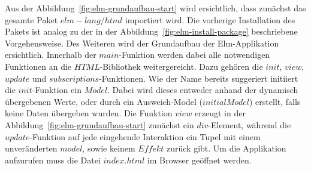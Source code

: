 Aus der Abbildung~\ref{fig:elm-grundaufbau-start} wird ersichtlich, dass zunächst das gesamte Paket $elm-lang/html$ importiert wird. Die vorherige Installation des Pakets ist analog zu der in der Abbildung~\ref{fig:elm-install-package} beschriebene Vorgehensweise. Des Weiteren wird der Grundaufbau der Elm-Applikation ersichtlich.
Innerhalb der $main$-Funktion werden dabei alle notwendigen Funktionen an die $HTML$-Bibliothek weitergereicht. Dazu gehören die $init$, $view$, $update$ und $subscriptions$-Funktionen. Wie der Name bereits suggeriert initiiert die $init$-Funktion ein $Model$. Dabei wird dieses entweder anhand der dynamisch übergebenen Werte, oder durch ein Ausweich-Model ($initialModel$) erstellt, falls keine Daten übergeben wurden.
Die Funktion $view$ erzeugt in der Abbildung~\ref{fig:elm-grundaufbau-start} zunächst ein $div$-Element, während die $update$-Funktion auf jede eingehende Interaktion ein Tupel mit einem unveränderten $model$, sowie keinem $Effekt$ zurück gibt. Um die Applikation aufzurufen muss die Datei $index.html$ im Browser geöffnet werden.


